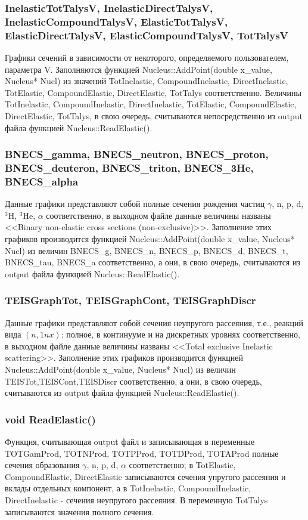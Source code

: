 \documentclass[a4paper,12pt]{extarticle}
\begin{document}
\subsubsection{InelasticTotTalysV, InelasticDirectTalysV, InelasticCompoundTalysV, ElasticTotTalysV, ElasticDirectTalysV, ElasticCompoundTalysV, TotTalysV}
Графики сечений в зависимости от некоторого, определяемого пользователем, параметра V. Заполняются функцией Nucleus::AddPoint(double x_value, Nucleus* Nucl) из значений TotInelastic, CompoundInelastic, DirectInelastic, TotElastic, CompoundElastic, DirectElastic,  TotTalys соответственно. Величины TotInelastic, CompoundInelastic, DirectInelastic, TotElastic, CompoundElastic, DirectElastic,  TotTalys, в свою очередь, считываются непосредственно из output файла функцией Nucleus::ReadElastic().
\subsubsection{BNECS_gamma, BNECS_neutron, BNECS_proton, BNECS_deuteron, BNECS_triton, BNECS_3He, BNECS_alpha}
Данные графики представляют собой полные сечения рождения частиц $\gamma$, n, p, d, $^3$H, $^3$He, $\alpha$ соответственно, в выходном файле данные величины названы <<Binary non-elastic cross sections (non-exclusive)>>. Заполнение этих графиков производится функцией Nucleus::AddPoint(double x_value, Nucleus* Nucl) из величин BNECS_g, BNECS_n, BNECS_p, BNECS_d, BNECS_t, BNECS_tau, BNECS_a соответственно, а они, в свою очередь, считываются из output файла функцией Nucleus::ReadElastic().
\subsubsection{TEISGraphTot, TEISGraphCont, TEISGraphDiscr}
Данные графики представляют собой сечения неупругого рассеяния, т.е., реакций вида $(n,1nx)$: полное, в континууме и на дискретных уровнях соответственно, в выходном файле данные величины названы <<Total exclusive Inelastic scattering>>. Заполнение этих графиков производится функцией Nucleus::AddPoint(double x_value, Nucleus* Nucl) из величин TEISTot,TEISCont,TEISDiscr соответственно, а они, в свою очередь, считываются из output файла функцией Nucleus::ReadElastic().
\subsubsection{void ReadElastic()}
Функция, считывающая output файл и записывающая в переменные TOTGamProd, TOTNProd, TOTPProd, TOTDProd, TOTAProd полные сечения образования $\gamma$, n, p, d, $\alpha$ соответственно;  в TotElastic, CompoundElastic, DirectElastic записываются сечения упругого рассеяния и вклады отдельных компонент, а в TotInelastic, CompoundInelastic, DirectInelastic - сечения неупругого рассеяния. В переменную TotTalys записываются значения полного сечения.
\end{document}
